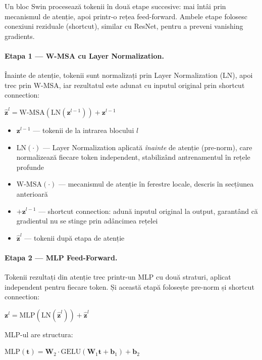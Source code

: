 \documentclass[12pt, a4paper]{report}
\newcommand{\formula}[1]{%
    \begin{center}
        \colorbox{codebackground}{%
            \parbox{0.88\textwidth}{\centering\vspace{4pt}$#1$\vspace{4pt}}%
        }
    \end{center}
}
\begin{document}
Un bloc Swin procesează tokenii în două etape succesive: mai întâi
prin mecanismul de atenție, apoi printr-o rețea feed-forward. Ambele
etape folosesc conexiuni reziduale (shortcut), similar cu ResNet,
pentru a preveni vanishing gradients.

\paragraph{Etapa 1 — W-MSA cu Layer Normalization.}
Înainte de atenție, tokenii sunt normalizați prin Layer Normalization
(LN), apoi trec prin W-MSA, iar rezultatul este adunat cu inputul
original prin shortcut connection:

\formula{
    \hat{\mathbf{z}}^l = \text{W-MSA}\!\left(\text{LN}(\mathbf{z}^{l-1})\right) + \mathbf{z}^{l-1}
}

\begin{itemize}
    \item $\mathbf{z}^{l-1}$ --- tokenii de la intrarea blocului $l$
    \item $\text{LN}(\cdot)$ --- Layer Normalization aplicată
    \textit{înainte} de atenție (pre-norm), care normalizează
    fiecare token independent, stabilizând antrenamentul în rețele
    profunde
    \item $\text{W-MSA}(\cdot)$ --- mecanismul de atenție în
    ferestre locale, descris în secțiunea anterioară
    \item $+ \mathbf{z}^{l-1}$ --- shortcut connection: adună
    inputul original la output, garantând că gradientul nu se
    stinge prin adâncimea rețelei
    \item $\hat{\mathbf{z}}^l$ --- tokenii după etapa de atenție
\end{itemize}

\paragraph{Etapa 2 — MLP Feed-Forward.}
Tokenii rezultați din atenție trec printr-un MLP cu două straturi,
aplicat independent pentru fiecare token. Și această etapă folosește
pre-norm și shortcut connection:

\formula{
    \mathbf{z}^l = \text{MLP}\!\left(\text{LN}(\hat{\mathbf{z}}^l)\right) + \hat{\mathbf{z}}^l
}

MLP-ul are structura:

\formula{
    \text{MLP}(\mathbf{t}) = \mathbf{W}_2 \cdot \text{GELU}(\mathbf{W}_1 \mathbf{t} + \mathbf{b}_1) + \mathbf{b}_2
}
\end{document}
